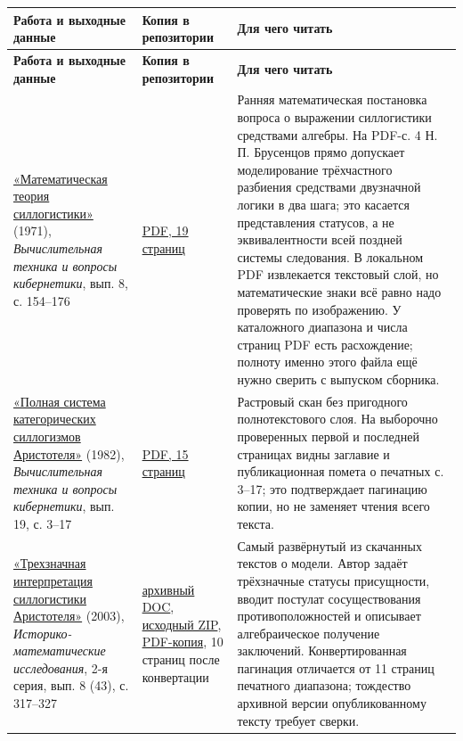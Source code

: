 \documentclass[12pt,a4paper]{article}
\begin{document}
\begin{longtable}{P{0.260\textwidth}P{0.300\textwidth}P{0.360\textwidth}}
\toprule
\textbf{Работа и выходные данные} & \textbf{Копия в репозитории} & \textbf{Для чего читать} \\
\midrule
\endfirsthead
\toprule
\textbf{Работа и выходные данные} & \textbf{Копия в репозитории} & \textbf{Для чего читать} \\
\midrule
\endhead
\href{https://www.computer-museum.ru/books/setun/brusencov_03.pdf}{«Математическая теория силлогистики»} (1971), \emph{Вычислительная техника и вопросы кибернетики}, вып. 8, с. 154–176 & \href{../sources/pdfs/Брусенцов_Математическая-теория-силлогистики_1971.pdf}{PDF, 19 страниц} & Ранняя математическая постановка вопроса о выражении силлогистики средствами алгебры. На PDF-с. 4 Н. П. Брусенцов прямо допускает моделирование трёхчастного разбиения средствами двузначной логики в два шага; это касается представления статусов, а не эквивалентности всей поздней системы следования. В локальном PDF извлекается текстовый слой, но математические знаки всё равно надо проверять по изображению. У каталожного диапазона и числа страниц PDF есть расхождение; полноту именно этого файла ещё нужно сверить с выпуском сборника. \\
\href{https://ternarycomp.cs.msu.ru/Papers/Brusentsov_Polnaya_sistema_V19.pdf}{«Полная система категорических силлогизмов Аристотеля»} (1982), \emph{Вычислительная техника и вопросы кибернетики}, вып. 19, с. 3–17 & \href{../sources/pdfs/Брусенцов_Полная-система-категорических-силлогизмов-Аристотеля_1982.pdf}{PDF, 15 страниц} & Растровый скан без пригодного полнотекстового слоя. На выборочно проверенных первой и последней страницах видны заглавие и публикационная помета о печатных с. 3–17; это подтверждает пагинацию копии, но не заменяет чтения всего текста. \\
\href{https://computer-museum.ru/histussr/trilog0.htm}{«Трехзначная интерпретация силлогистики Аристотеля»} (2003), \emph{Историко-математические исследования}, 2-я серия, вып. 8 (43), с. 317–327 & \href{../sources/legacy-docs/TRILOG33.DOC}{архивный DOC}, \href{../sources/archives/Трехзначная-интерпретация-силлогистики-Аристотеля_archive.zip}{исходный ZIP}, \href{../sources/pdfs/Брусенцов_Трехзначная-интерпретация-силлогистики-Аристотеля_2003_версия-музея.pdf}{PDF-копия}, 10 страниц после конвертации & Самый развёрнутый из скачанных текстов о модели. Автор задаёт трёхзначные статусы присущности, вводит постулат сосуществования противоположностей и описывает алгебраическое получение заключений. Конвертированная пагинация отличается от 11 страниц печатного диапазона; тождество архивной версии опубликованному тексту требует сверки. \\

\end{longtable}
\end{document}
